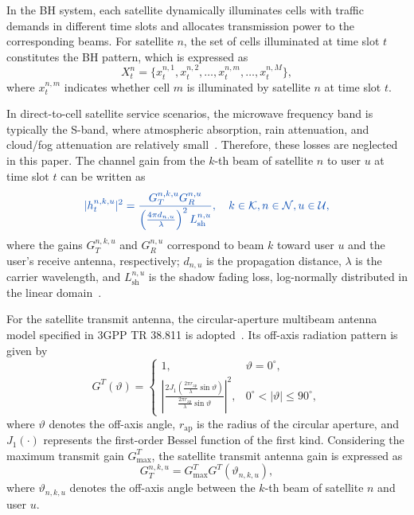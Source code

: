 \documentclass[journal]{IEEEtran}
\newcommand{\revbegin}[1]{\color{revisionblue}\ignorespaces}
\newcommand{\revend}[1]{\color{black}\ignorespaces}
\begin{document}
In the BH system, each satellite dynamically illuminates cells with traffic demands in different time slots and allocates transmission power to the corresponding beams. For satellite $n$, the set of cells illuminated at time slot $t$ constitutes the BH pattern, which is expressed as
\begin{equation}
X_t^n=
\{x_t^{n,1},x_t^{n,2},\ldots,x_t^{n,m},\ldots,x_t^{n,M}\},
\end{equation}
where $x_t^{n,m}$ indicates whether cell $m$ is illuminated by satellite $n$ at time slot $t$.

In direct-to-cell satellite service scenarios, the microwave frequency band is typically the S-band, where atmospheric absorption, rain attenuation, and cloud/fog attenuation are relatively small~\cite{ref24,ref25,ref26}. Therefore, these losses are neglected in this paper. The channel gain from the $k$-th beam of satellite $n$ to user $u$ at time slot $t$ can be written as
\begin{equation}\color{revisionblue}
|h_t^{n,k,u}|^2
=
\frac{
G_T^{n,k,u}G_R^{n,u}
}{
\left(\frac{4\pi d_{n,u}}{\lambda}\right)^2
L_{\mathrm{sh}}^{n,u}
},
\quad
k\in\mathcal{K}, n\in\mathcal{N}, u\in\mathcal{U},
\end{equation}
\revbegin{}where the gains $G_T^{n,k,u}$ and $G_R^{n,u}$ correspond to beam $k$ toward user $u$ and the user's receive antenna, respectively; $d_{n,u}$ is the propagation distance, $\lambda$ is the carrier wavelength, and $L_{\mathrm{sh}}^{n,u}$ is the shadow fading loss, log-normally distributed in the linear domain~\cite{ref27}.\revend{}

For the satellite transmit antenna, the circular-aperture multibeam antenna model specified in 3GPP TR 38.811 is adopted~\cite{ref28}. Its off-axis radiation pattern is given by
\begin{equation}
G^T(\vartheta)=
\begin{cases}
1, & \vartheta=0^\circ,\\
\left|
\frac{
2J_1\left(\frac{2\pi r_{\mathrm{ap}}}{\lambda}\sin\vartheta\right)
}{
\frac{2\pi r_{\mathrm{ap}}}{\lambda}\sin\vartheta
}
\right|^2,
& 0^\circ<|\vartheta|\leq90^\circ,
\end{cases}
\end{equation}
where $\vartheta$ denotes the off-axis angle, $r_{\mathrm{ap}}$ is the radius of the circular aperture, and $J_1(\cdot)$ represents the first-order Bessel function of the first kind. Considering the maximum transmit gain $G_{\max}^T$, the satellite transmit antenna gain is expressed as
\begin{equation}
G_T^{n,k,u}
=
G_{\max}^T G^T(\vartheta_{n,k,u}),
\end{equation}
where $\vartheta_{n,k,u}$ denotes the off-axis angle between the $k$-th beam of satellite $n$ and user $u$.
\end{document}
